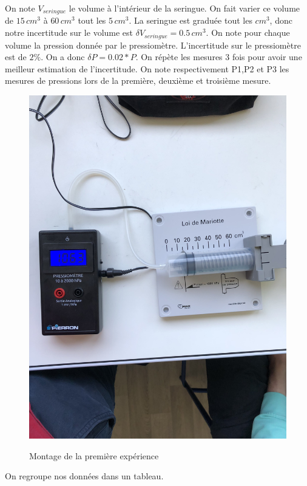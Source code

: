 \documentclass[12pt]{article}
\begin{document}
On note $V_{seringue}$ le volume à l'intérieur de la seringue. On fait varier ce volume de $15\, cm^3$ à $60\, cm^3$ tout les $5\, cm^3$. La seringue est graduée tout les $cm^3$, donc notre incertitude sur le volume est $\delta V_{seringue}=0.5 \, cm^3$.  On note pour chaque volume la pression donnée par le pressiomètre. L'incertitude sur le pressiomètre est de $2\% $. On a donc $\delta P = 0.02*P$. On répète les mesures 3 fois pour avoir une meilleur estimation de l'incertitude. On note respectivement P1,P2 et P3 les mesures de pressions lors de la première, deuxième et troisième mesure. 

\begin{figure}[!h]
	\begin{center}
		\includegraphics[scale=0.04]{img/exp1.png}
		\label{Photo exp1}
		\caption{Montage de la première expérience}
	\end{center}
\end{figure}
\newpage
On regroupe nos données dans un tableau.
\end{document}
